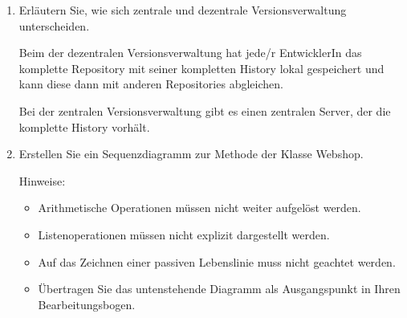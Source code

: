 \documentclass{bschlangaul-aufgabe}
\begin{document}
\begin{enumerate}
\begin{bAntwort}
\begin{itemize}
\item Das Überladen von Methoden findet in derselben Klasse statt,
während das Überschreiben in einer von einer Basisklasse abgeleiteten
Klasse stattfindet.\footcite[Seite 27-28]{oomup:fs:3}

\end{itemize}
\end{bAntwort}


\item Erläutern Sie, wie sich zentrale und dezentrale Versionsverwaltung
unterscheiden.

\begin{bAntwort}
Beim der dezentralen Versionsverwaltung hat jede/r EntwicklerIn das
komplette Repository mit seiner kompletten History lokal gespeichert und
kann diese dann mit anderen Repositories abgleichen.

Bei der zentralen Versionsverwaltung gibt es einen zentralen Server, der
die komplette History vorhält.
\end{bAntwort}


\item Erstellen Sie ein Sequenzdiagramm zur Methode 
der Klasse Webshop.

Hinweise:
\begin{itemize}
\item Arithmetische Operationen müssen nicht weiter aufgelöst werden.

\item Listenoperationen müssen nicht explizit dargestellt werden.

\item Auf das Zeichnen einer passiven Lebenslinie muss nicht geachtet
werden.

\item Übertragen Sie das untenstehende Diagramm als Ausgangspunkt in
Ihren Bearbeitungsbogen.
\end{itemize}

\end{enumerate}


\newpage
\end{document}
